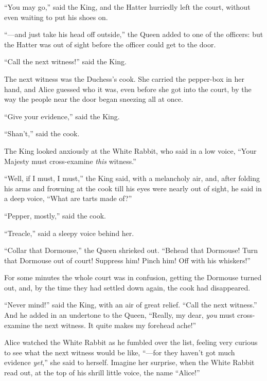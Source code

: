 \documentclass[book, 20pt]{extbook}
\begin{document}
``You may go,'' said the King, and the Hatter hurriedly left the court,
without even waiting to put his shoes on.

``---and just take his head off outside,'' the Queen added to one of the
officers: but the Hatter was out of sight before the officer could get
to the door.

``Call the next witness!'' said the King.

The next witness was the Duchess's cook. She carried the pepper-box in
her hand, and Alice guessed who it was, even before she got into the
court, by the way the people near the door began sneezing all at once.

``Give your evidence,'' said the King.

``Shan't,'' said the cook.

The King looked anxiously at the White Rabbit, who said in a low voice,
``Your Majesty must cross-examine \emph{this} witness.''

``Well, if I must, I must,'' the King said, with a melancholy air, and,
after folding his arms and frowning at the cook till his eyes were
nearly out of sight, he said in a deep voice, ``What are tarts made
of?''

``Pepper, mostly,'' said the cook.

``Treacle,'' said a sleepy voice behind her.

``Collar that Dormouse,'' the Queen shrieked out. ``Behead that
Dormouse! Turn that Dormouse out of court! Suppress him! Pinch him! Off
with his whiskers!''

For some minutes the whole court was in confusion, getting the Dormouse
turned out, and, by the time they had settled down again, the cook had
disappeared.

``Never mind!'' said the King, with an air of great relief. ``Call the
next witness.'' And he added in an undertone to the Queen, ``Really, my
dear, \emph{you} must cross-examine the next witness. It quite makes my
forehead ache!''

Alice watched the White Rabbit as he fumbled over the list, feeling very
curious to see what the next witness would be like, ``---for they
haven't got much evidence \emph{yet},'' she said to herself. Imagine her
surprise, when the White Rabbit read out, at the top of his shrill
little voice, the name ``Alice!''

\chapter*{}
\end{document}
